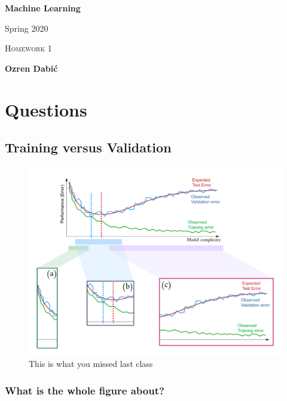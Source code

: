 \documentclass[12pt,a4paper]{article}
\begin{document}
\begin{center}
  
  \bigskip \bigskip

  {\huge \textbf{Machine Learning}}

  \bigskip
  
  {\large Spring 2020}

  \bigskip \bigskip

  {\large \textsc{Homework 1}} 
  
  \bigskip \bigskip
  
  {\large \textbf{Ozren Dabić}}
  
  \bigskip \bigskip

\end{center}

\section*{Questions}

\subsection*{Training versus Validation}

\begin{figure}[h!]
\begin{center}    
\includegraphics[height=0.7\textwidth,keepaspectratio]{figures/figure1}
\end{center}
\caption{This is what you missed last class}
\end{figure}

\subsubsection*{What is the whole figure about?}
\end{document}
